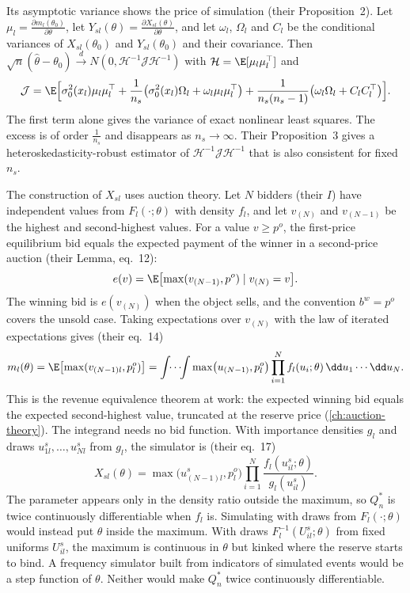 Its asymptotic variance shows the price of simulation (their Proposition~2). Let $\mu_l = \frac{\partial
m_l(\theta_0)}{\partial\theta}$, let $Y_{sl}(\theta) = \frac{\partial X_{sl}(\theta)}{\partial\theta}$, and let
$\omega_l$, $\Omega_l$ and $C_l$ be the conditional variances of $X_{sl}(\theta_0)$ and $Y_{sl}(\theta_0)$ and their
covariance. Then $\sqrt n(\hat\theta - \theta_0) \xrightarrow{d} N(0, \mathcal{H}^{-1}\mathcal{J}\mathcal{H}^{-1})$ with
$\mathcal{H} = \E[\mu_l\mu_l^\top]$ and
\begin{equation}\label{eq:A-lov-avar}
  \mathcal{J} = \E\Bigl[\sigma_0^2(x_l)\mu_l\mu_l^\top + \frac{1}{n_s}\bigl(\sigma_0^2(x_l)\Omega_l + \omega_l\mu_l\mu_l^\top\bigr)
  + \frac{1}{n_s(n_s - 1)}\bigl(\omega_l\Omega_l + C_lC_l^\top\bigr)\Bigr].
\end{equation}
The first term alone gives the variance of exact nonlinear least squares. The excess is of order $\frac{1}{n_s}$
and disappears as $n_s \to \infty$. Their Proposition~3 gives a heteroskedasticity-robust estimator of
$\mathcal{H}^{-1}\mathcal{J}\mathcal{H}^{-1}$ that is also consistent for fixed $n_s$.

The construction of $X_{sl}$ uses auction theory. Let $N$ bidders (their $I$) have independent values from $F_l(\cdot;\theta)$
with density $f_l$, and let $v_{(N)}$ and $v_{(N-1)}$ be the highest and second-highest values. For a value $v \ge
p^o$, the first-price equilibrium bid equals the expected payment of the winner in a second-price auction (their
Lemma, eq.~12):
\begin{equation*}
  e(v) = \E\bigl[\max(v_{(N-1)}, p^o) \mid v_{(N)} = v\bigr].
\end{equation*}
The winning bid is $e(v_{(N)})$ when the object sells, and the convention $b^w = p^o$ covers the unsold case. Taking
expectations over $v_{(N)}$ with the law of iterated expectations gives (their eq.~14)
\begin{equation*}
  m_l(\theta) = \E\bigl[\max(v_{(N-1)l}, p^o_l)\bigr]
  = \int\!\!\cdots\!\!\int\max\bigl(u_{(N-1)}, p^o_l\bigr)\prod_{i=1}^{N}f_l(u_i;\theta)\,\dd u_1\cdots\dd u_N.
\end{equation*}
This is the revenue equivalence theorem at work: the expected winning bid equals the expected second-highest value,
truncated at the reserve price (\cref{ch:auction-theory}). The integrand needs no bid function. With importance
densities $g_l$ and draws $u^s_{1l}, \dots, u^s_{Nl}$ from $g_l$, the simulator is (their eq.~17)
\begin{equation*}
  X_{sl}(\theta) = \max\bigl(u^s_{(N-1)l}, p^o_l\bigr)\prod_{i=1}^{N}\frac{f_l(u^s_{il};\theta)}{g_l(u^s_{il})}.
\end{equation*}
The parameter appears only in the density ratio outside the maximum, so $Q^*_n$ is twice continuously
differentiable when $f_l$ is. Simulating with draws from $F_l(\cdot;\theta)$ would instead put $\theta$ inside the
maximum. With draws $F_l^{-1}(U^s_{il};\theta)$ from fixed uniforms $U^s_{il}$, the maximum is continuous in $\theta$ but
kinked where the reserve starts to bind. A frequency simulator built from indicators of simulated events would be a
step function of $\theta$. Neither would make $Q^*_n$ twice continuously differentiable.

